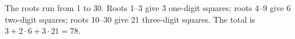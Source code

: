 The roots run from 1 to 30. Roots 1--3 give 3 one-digit squares; roots 4--9 give 6 two-digit squares; roots 10--30 give 21 three-digit squares. The total is $ 3+2\cdot6+3\cdot21=\boxed{78}$.
